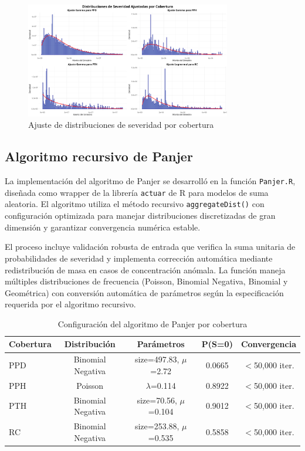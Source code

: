 \begin{figure}[H]
\centering
\includegraphics[width=0.8\textwidth]{../images/ajuste_distribuciones_severidad.png}
\caption{Ajuste de distribuciones de severidad por cobertura}
\end{figure}

\subsection{Algoritmo recursivo de Panjer}

La implementación del algoritmo de Panjer se desarrolló en la función \texttt{Panjer.R}, diseñada como wrapper de la librería \texttt{actuar} de R para modelos de suma aleatoria. El algoritmo utiliza el método recursivo \texttt{aggregateDist()} con configuración optimizada para manejar distribuciones discretizadas de gran dimensión y garantizar convergencia numérica estable.

El proceso incluye validación robusta de entrada que verifica la suma unitaria de probabilidades de severidad y implementa corrección automática mediante redistribución de masa en casos de concentración anómala. La función maneja múltiples distribuciones de frecuencia (Poisson, Binomial Negativa, Binomial y Geométrica) con conversión automática de parámetros según la especificación requerida por el algoritmo recursivo.

\begin{table}[H]
\centering
\caption{Configuración del algoritmo de Panjer por cobertura}
\begin{tabular}{lcccc}
\hline
\textbf{Cobertura} & \textbf{Distribución} & \textbf{Parámetros} & \textbf{P(S=0)} & \textbf{Convergencia} \\
\hline
PPD & Binomial Negativa & size=497.83, $\mu$=2.72 & 0.0665 & $<$50,000 iter. \\
PPH & Poisson & $\lambda$=0.114 & 0.8922 & $<$50,000 iter. \\
PTH & Binomial Negativa & size=70.56, $\mu$=0.104 & 0.9012 & $<$50,000 iter. \\
RC & Binomial Negativa & size=253.88, $\mu$=0.535 & 0.5858 & $<$50,000 iter. \\
\hline
\end{tabular}
\end{table}

